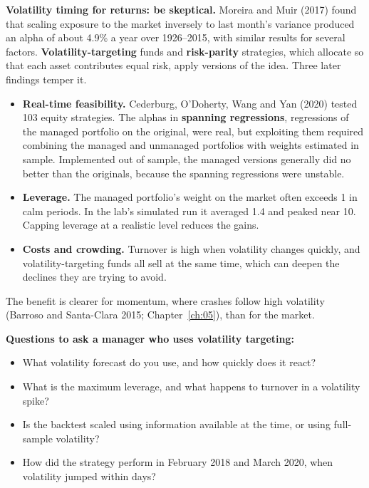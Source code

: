 \textbf{Volatility timing for returns: be skeptical.} Moreira and Muir (2017) found that scaling exposure to the market inversely to last month's variance produced an alpha of about 4.9\% a year over 1926--2015, with similar results for several factors. \textbf{Volatility-targeting} funds and \textbf{risk-parity} strategies, which allocate so that each asset contributes equal risk, apply versions of the idea. Three later findings temper it.

\begin{itemize}
  \item \textbf{Real-time feasibility.} Cederburg, O'Doherty, Wang and Yan (2020) tested 103 equity strategies. The alphas in \textbf{spanning regressions}, regressions of the managed portfolio on the original, were real, but exploiting them required combining the managed and unmanaged portfolios with weights estimated in sample. Implemented out of sample, the managed versions generally did no better than the originals, because the spanning regressions were unstable.
  \item \textbf{Leverage.} The managed portfolio's weight on the market often exceeds 1 in calm periods. In the lab's simulated run it averaged 1.4 and peaked near 10. Capping leverage at a realistic level reduces the gains.
  \item \textbf{Costs and crowding.} Turnover is high when volatility changes quickly, and volatility-targeting funds all sell at the same time, which can deepen the declines they are trying to avoid.
\end{itemize}

The benefit is clearer for momentum, where crashes follow high volatility (Barroso and Santa-Clara 2015; Chapter~\ref{ch:05}), than for the market.

\textbf{Questions to ask a manager who uses volatility targeting:}

\begin{itemize}
  \item What volatility forecast do you use, and how quickly does it react?
  \item What is the maximum leverage, and what happens to turnover in a volatility spike?
  \item Is the backtest scaled using information available at the time, or using full-sample volatility?
  \item How did the strategy perform in February 2018 and March 2020, when volatility jumped within days?
\end{itemize}

